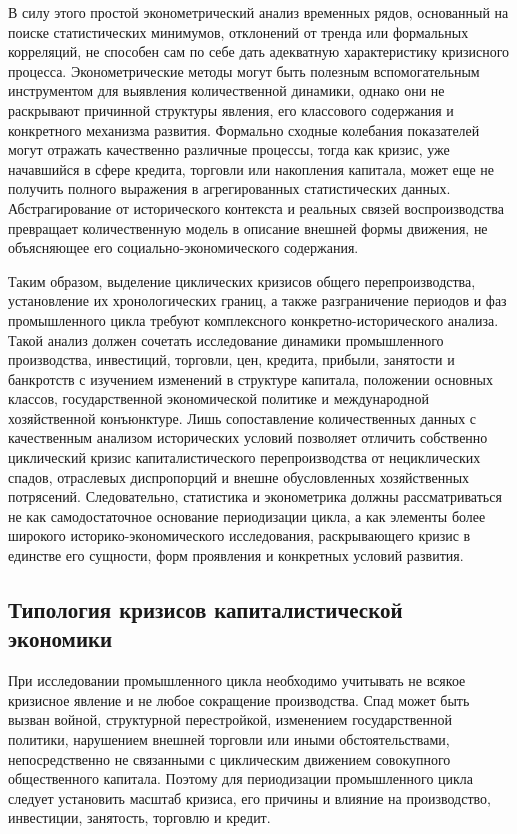 В силу этого простой эконометрический анализ временных рядов, основанный на поиске статистических минимумов, отклонений от тренда или формальных корреляций, не способен сам по себе дать адекватную характеристику кризисного процесса. Эконометрические методы могут быть полезным вспомогательным инструментом для выявления количественной динамики, однако они не раскрывают причинной структуры явления, его классового содержания и конкретного механизма развития. Формально сходные колебания показателей могут отражать качественно различные процессы, тогда как кризис, уже начавшийся в сфере кредита, торговли или накопления капитала, может еще не получить полного выражения в агрегированных статистических данных. Абстрагирование от исторического контекста и реальных связей воспроизводства превращает количественную модель в описание внешней формы движения, не объясняющее его социально-экономического содержания.

Таким образом, выделение циклических кризисов общего перепроизводства, установление их хронологических границ, а также разграничение периодов и фаз промышленного цикла требуют комплексного конкретно-исторического анализа. Такой анализ должен сочетать исследование динамики промышленного производства, инвестиций, торговли, цен, кредита, прибыли, занятости и банкротств с изучением изменений в структуре капитала, положении основных классов, государственной экономической политике и международной хозяйственной конъюнктуре. Лишь сопоставление количественных данных с качественным анализом исторических условий позволяет отличить собственно циклический кризис капиталистического перепроизводства от нециклических спадов, отраслевых диспропорций и внешне обусловленных хозяйственных потрясений. Следовательно, статистика и эконометрика должны рассматриваться не как самодостаточное основание периодизации цикла, а как элементы более широкого историко-экономического исследования, раскрывающего кризис в единстве его сущности, форм проявления и конкретных условий развития.

\subsection{Типология кризисов капиталистической экономики}
При исследовании промышленного цикла необходимо учитывать не всякое кризисное явление и не любое сокращение производства. Спад может быть вызван войной, структурной перестройкой, изменением государственной политики, нарушением внешней торговли или иными обстоятельствами, непосредственно не связанными с циклическим движением совокупного общественного капитала. Поэтому для периодизации промышленного цикла следует установить масштаб кризиса, его причины и влияние на производство, инвестиции, занятость, торговлю и кредит.


